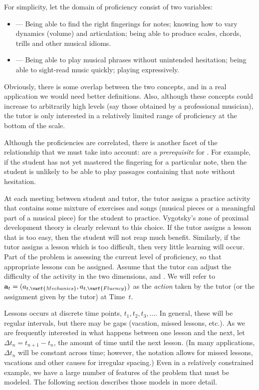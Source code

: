 \documentclass[12pt]{RR-article}
\begin{document}
For simplicity, let the domain of proficiency consist of two
variables:
\begin{itemize}%
\item {} --- Being able to find the right fingerings for
  notes;   knowing how to vary dynamics (volume) and articulation;
  being able to produce scales, chords, trills and other musical idioms.
\item {} --- Being able to play musical phrases without
  unintended hesitation; being able to sight-read music quickly;
  playing expressively.  
\end{itemize}
Obviously, there is some overlap between the two concepts, and in a
real application we would need better definitions.  Also, although
these concepts could increase to arbitrarily high levels (say those
obtained by a professional musician), the tutor is only interested
in a relatively limited range of proficiency at the bottom of the
scale.  

Although the proficiencies are correlated, there is another facet of
the relationship that we must take into account:   are a
\textit{prerequisite\/} for .  For example, if the student
has not yet mastered the fingering for a particular note, then the
student is unlikely to be able to play passages containing that note
without hesitation.

At each meeting between student and tutor, the tutor assigns a
practice activity that contains some mixture of exercises and songs
(musical pieces or a meaningful part of a musical piece) for the
student to practice.  Vygotsky's zone of proximal development theory
\cite{Vygotsky1978} is clearly relevant to this choice.  If the
tutor assigns a lesson that is too easy, then the student will not
reap much benefit.  Similarly, if the tutor assigns a lesson which
is too difficult, then very little learning will occur.  Part of the
problem is assessing the current level of proficiency, so that
appropriate lessons can be assigned.  Assume that the tutor can
adjust the difficulty of the activity in the two dimensions,
 and .  We will refer to ${\bf
a}_t=(a_{t,\varf{Mechanics}},a_{t,\varf{Fluency}})$ as the
\textit{action\/} taken by the tutor (or the assignment given by the
tutor) at Time~$t$.

Lessons occurs at discrete time points, $t_1, t_2, t_3,\ldots$.  In
general, these will be regular intervals, but there may be gaps
(vacation, missed lessons, etc.).  As we are frequently interested in
what happens between one lesson and the next, let $\Delta t_n =
t_{n+1} - t_{n}$, the amount of time until the next lesson.  (In many
applications, $\Delta t_n$ will be constant across time; however, the
notation allows for missed lessons, vacations and other causes for
irregular spacing.)  Even in a relatively constrained example, we have
a large number of features of the problem that must be modeled.  The
following section describes those models in more detail.
\end{document}
